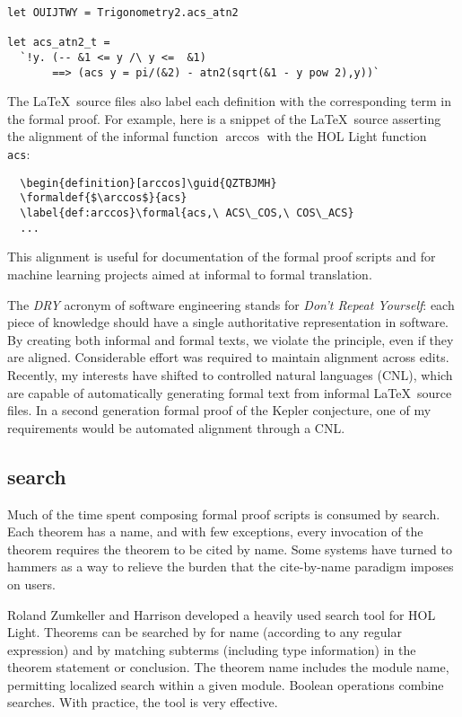 \documentclass{amsart}
\begin{document}
\begin{verbatim}
let OUIJTWY = Trigonometry2.acs_atn2

let acs_atn2_t = 
  `!y. (-- &1 <= y /\ y <=  &1) 
       ==> (acs y = pi/(&2) - atn2(sqrt(&1 - y pow 2),y))`
\end{verbatim}

The \LaTeX\ source files also label each definition with the
corresponding term in the formal proof. For example, here is a snippet
of the \LaTeX\ source asserting the alignment
of the informal function $\arccos$ with the HOL Light function {\tt
  acs}:

\begin{verbatim}
  \begin{definition}[arccos]\guid{QZTBJMH}
  \formaldef{$\arccos$}{acs}
  \label{def:arccos}\formal{acs,\ ACS\_COS,\ COS\_ACS}
  ...
\end{verbatim}

This alignment is useful for documentation of the formal proof scripts
and for machine learning projects aimed at informal to formal
translation.

The \emph{DRY} acronym of software engineering stands for \emph{Don't
  Repeat Yourself}: each piece of knowledge should have a single
authoritative representation in software.  By creating both informal
and formal texts, we violate the principle, even if they are aligned.
Considerable effort was required to maintain alignment across edits.
Recently, my interests have shifted to controlled natural languages
(CNL), which are capable of automatically generating formal text from
informal \LaTeX\ source files.  In a second generation formal proof of
the Kepler conjecture, one of my requirements would be automated
alignment through a CNL.

\subsection{search}

Much of the time spent composing formal proof scripts is consumed by
search.  Each theorem has a name, and with few exceptions, every
invocation of the theorem requires the theorem to be cited by name.
Some systems have turned to hammers as a way to relieve the burden
that the cite-by-name paradigm imposes on users.

Roland Zumkeller and Harrison developed a heavily used search tool for
HOL Light.  Theorems can be searched by for name (according to any
regular expression) and by matching subterms (including type
information) in the theorem statement or conclusion.  The theorem name
includes the module name, permitting localized search within a given
module.  Boolean operations combine searches.  With practice, the tool
is very effective.
\end{document}
